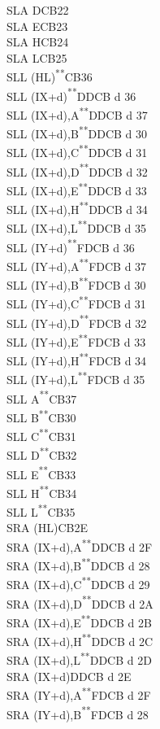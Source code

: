 \documentclass[12pt,twoside,openright,a4paper]{book}
\newcommand{\UNDOC}{\textnormal{\textsuperscript{**}}}
\begin{document}
\begin{multicols}{3}
{\begin{tabbing}
	SLA D\>CB22\\
	SLA E\>CB23\\
	SLA H\>CB24\\
	SLA L\>CB25\\
	SLL (HL)\UNDOC\>CB36\\
	SLL (IX+d)\UNDOC\>DDCB d 36\\
	SLL (IX+d),A\UNDOC\>DDCB d 37\\
	SLL (IX+d),B\UNDOC\>DDCB d 30\\
	SLL (IX+d),C\UNDOC\>DDCB d 31\\
	SLL (IX+d),D\UNDOC\>DDCB d 32\\
	SLL (IX+d),E\UNDOC\>DDCB d 33\\
	SLL (IX+d),H\UNDOC\>DDCB d 34\\
	SLL (IX+d),L\UNDOC\>DDCB d 35\\
	SLL (IY+d)\UNDOC\>FDCB d 36\\
	SLL (IY+d),A\UNDOC\>FDCB d 37\\
	SLL (IY+d),B\UNDOC\>FDCB d 30\\
	SLL (IY+d),C\UNDOC\>FDCB d 31\\
	SLL (IY+d),D\UNDOC\>FDCB d 32\\
	SLL (IY+d),E\UNDOC\>FDCB d 33\\
	SLL (IY+d),H\UNDOC\>FDCB d 34\\
	SLL (IY+d),L\UNDOC\>FDCB d 35\\
	SLL A\UNDOC\>CB37\\
	SLL B\UNDOC\>CB30\\
	SLL C\UNDOC\>CB31\\
	SLL D\UNDOC\>CB32\\
	SLL E\UNDOC\>CB33\\
	SLL H\UNDOC\>CB34\\
	SLL L\UNDOC\>CB35\\
	SRA (HL)\>CB2E\\
	SRA (IX+d),A\UNDOC\>DDCB d 2F\\
	SRA (IX+d),B\UNDOC\>DDCB d 28\\
	SRA (IX+d),C\UNDOC\>DDCB d 29\\
	SRA (IX+d),D\UNDOC\>DDCB d 2A\\
	SRA (IX+d),E\UNDOC\>DDCB d 2B\\
	SRA (IX+d),H\UNDOC\>DDCB d 2C\\
	SRA (IX+d),L\UNDOC\>DDCB d 2D\\
	SRA (IX+d)\>DDCB d 2E\\
	SRA (IY+d),A\UNDOC\>FDCB d 2F\\
	SRA (IY+d),B\UNDOC\>FDCB d 28\\

\end{tabbing}}
\end{multicols}
\end{document}
